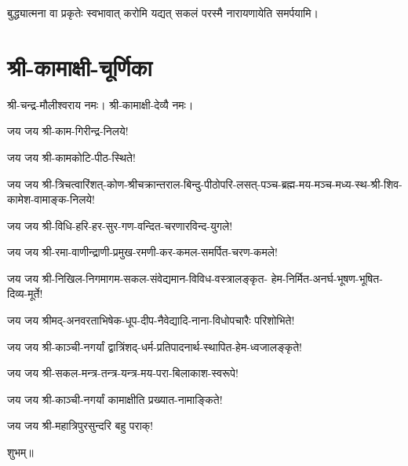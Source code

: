 {बुद्ध्यात्मना वा प्रकृतेः स्वभावात्}
{करोमि यद्यत् सकलं परस्मै}
{नारायणायेति समर्पयामि।}

\closesub


\section{श्री-कामाक्षी-चूर्णिका}

श्री-चन्द्र-मौलीश्वराय नमः। श्री-कामाक्षी-देव्यै नमः।

जय जय श्री-काम-गिरीन्द्र-निलये!

जय जय श्री-कामकोटि-पीठ-स्थिते!

जय जय श्री-त्रिचत्वारिंशत्-कोण-श्रीचक्रान्तराल-बिन्दु-पीठोपरि-लसत्-पञ्च-ब्रह्म-मय-मञ्च-मध्य-स्थ-श्री-शिव-कामेश-वामाङ्क-निलये!

जय जय श्री-विधि-हरि-हर-सुर-गण-वन्दित-चरणारविन्द-युगले!

जय जय श्री-रमा-वाणीन्द्राणी-प्रमुख-रमणी-कर-कमल-समर्पित-चरण-कमले!

जय जय श्री-निखिल-निगमागम-सकल-संवेद्यमान-विविध-वस्त्रालङ्कृत-
हेम-निर्मित-अनर्घ-भूषण-भूषित-दिव्य-मूर्ते!

जय जय श्रीमद्-अनवरताभिषेक-धूप-दीप-नैवेद्यादि-नाना-विधोपचारैः परिशोभिते!

जय जय श्री-काञ्ची-नगर्यां द्वात्रिंशद्-धर्म-प्रतिपादनार्थ-स्थापित-हेम-ध्वजालङ्कृते!

जय जय श्री-सकल-मन्त्र-तन्त्र-यन्त्र-मय-परा-बिलाकाश-स्वरूपे!

जय जय श्री-काञ्ची-नगर्यां कामाक्षीति प्रख्यात-नामाङ्किते!

जय जय श्री-महात्रिपुरसुन्दरि बहु पराक्!


\centerline{शुभम्॥}

\closesub
\begingroup
{}
\endgroup
\closesection
